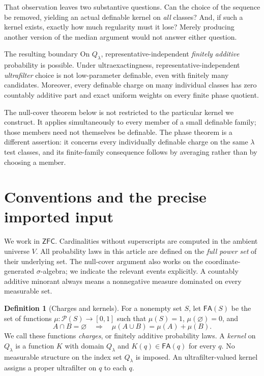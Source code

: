 \documentclass[11pt,letterpaper]{article}
\theoremstyle{definition}
\newtheorem{definition}{Definition}[section]
\newcommand{\ZFC}{\mathsf{ZFC}}
\newcommand{\FA}{\mathsf{FA}}
\newcommand{\Pow}{\mathcal P}
\newcommand{\Qlam}{Q_\lambda}
\begin{document}
That observation leaves two substantive questions. Can the choice of the sequence be removed, yielding an actual definable kernel on \emph{all} classes? And, if such a kernel exists, exactly how much regularity must it lose? Merely producing another version of the median argument would not answer either question.

\begin{assessment}{The resulting boundary}
On $\Qlam$, representative-independent \emph{finitely additive} probability is possible. Under ultraexactingness, representative-independent \emph{ultrafilter} choice is not low-parameter definable, even with finitely many candidates. Moreover, every definable charge on many individual classes has zero countably additive part and exact uniform weights on every finite phase quotient.
\end{assessment}

The null-cover theorem below is not restricted to the particular kernel we construct. It applies simultaneously to every member of a small definable family; those members need not themselves be definable. The phase theorem is a different assertion: it concerns every individually definable charge on the same $\lambda$ test classes, and its finite-family consequence follows by averaging rather than by choosing a member.

\section{Conventions and the precise imported input}\label{sec:setup}

We work in $\ZFC$. Cardinalities without superscripts are computed in the ambient universe $V$. All probability laws in this article are defined on the \emph{full power set} of their underlying set. The null-cover argument also works on the coordinate-generated $\sigma$-algebra; we indicate the relevant events explicitly. A countably additive minorant always means a nonnegative measure dominated on every measurable set.

\begin{definition}[Charges and kernels]
For a nonempty set $S$, let $\FA(S)$ be the set of functions $\mu:\Pow(S)\to[0,1]$ such that $\mu(S)=1$, $\mu(\varnothing)=0$, and
\[
 A\cap B=\varnothing\quad\Longrightarrow\quad
 \mu(A\cup B)=\mu(A)+\mu(B).
\]
We call these functions \emph{charges}, or finitely additive probability laws. A \emph{kernel} on $\Qlam$ is a function $K$ with domain $\Qlam$ and $K(q)\in\FA(q)$ for every $q$. No measurable structure on the index set $\Qlam$ is imposed. An ultrafilter-valued kernel assigns a proper ultrafilter on $q$ to each $q$.
\end{definition}
\end{document}
